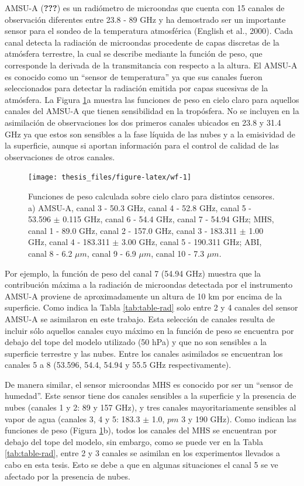 \documentclass[12pt,oneside]{reedthesis}
\begin{document}
AMSU-A ({\textbf{???}}) es un radiómetro de microondas que cuenta con 15 canales de observación diferentes entre 23.8 - 89 GHz y ha demostrado ser un importante sensor para el sondeo de la temperatura atmosférica (English et al., 2000). Cada canal detecta la radiación de microondas procedente de capas discretas de la atmósfera terrestre, la cual se describe mediante la función de peso, que corresponde la derivada de la transmitancia con respecto a la altura. El AMSU-A es conocido como un ``sensor de temperatura'' ya que sus canales fueron seleccionados para detectar la radiación emitida por capas sucesivas de la atmósfera. La Figura \ref{fig:wf}a muestra las funciones de peso en cielo claro para aquellos canales del AMSU-A que tienen sensibilidad en la tropósfera. No se incluyen en la asimilación de observaciones los dos primeros canales ubicados en 23.8 y 31.4 GHz ya que estos son sensibles a la fase líquida de las nubes y a la emisividad de la superficie, aunque si aportan información para el control de calidad de las observaciones de otros canales.


\begin{figure}

{\centering \texttt{[image: thesis\_files/figure-latex/wf-1]} 

}

\caption{Funciones de peso calculada sobre cielo claro para distintos censores. a) AMSU-A, canal 3 - 50.3 GHz, canal 4 - 52.8 GHz, canal 5 - 53.596 \(\pm\) 0.115 GHz, canal 6 - 54.4 GHz, canal 7 - 54.94 GHz; MHS, canal 1 - 89.0 GHz, canal 2 - 157.0 GHz, canal 3 - 183.311 \(\pm\) 1.00 GHz, canal 4 - 183.311 \(\pm\) 3.00 GHz, canal 5 - 190.311 GHz; ABI, canal 8 - 6.2 \(\mu m\), canal 9 - 6.9 \(\mu m\), canal 10 - 7.3 \(\mu m\).}\label{fig:wf}
\end{figure}
Por ejemplo, la función de peso del canal 7 (54.94 GHz) muestra que la contribución máxima a la radiación de microondas detectada por el instrumento AMSU-A proviene de aproximadamente un altura de 10 km por encima de la superficie. Como indica la Tabla \ref{tab:table-rad} solo entre 2 y 4 canales del sensor AMSU-A se asimilaron en este trabajo. Esta selección de canales resulta de incluir sólo aquellos canales cuyo máximo en la función de peso se encuentra por debajo del tope del modelo utilizado (50 hPa) y que no son sensibles a la superficie terrestre y las nubes. Entre los canales asimilados se encuentran los canales 5 a 8 (53.596, 54.4, 54.94 y 55.5 GHz respectivamente).

De manera similar, el sensor microondas MHS es conocido por ser un ``sensor de humedad''. Este sensor tiene dos canales sensibles a la superficie y la presencia de nubes (canales 1 y 2: 89 y 157 GHz), y tres canales mayoritariamente sensibles al vapor de agua (canales 3, 4 y 5: 183.3 \(\pm\) 1.0, \(pm\) 3 y 190 GHz). Como indican las funciones de peso (Figura \ref{fig:wf}b), todos los canales del MHS se encuentran por debajo del tope del modelo, sin embargo, como se puede ver en la Tabla \ref{tab:table-rad}, entre 2 y 3 canales se asimilan en los experimentos llevados a cabo en esta tesis. Esto se debe a que en algunas situaciones el canal 5 se ve afectado por la presencia de nubes.
\end{document}
